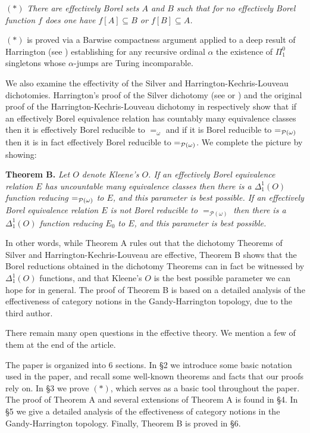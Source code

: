 \documentclass[11pt, english]{article}
\begin{document}
$(*)$ \emph{There are effectively Borel sets $A$ and $B$ such that
for no effectively Borel function $f$ does one have $f[A]\subseteq
B$ or $f[B]\subseteq A$.}

\medskip

$(*)$ is proved via a Barwise compactness argument applied to a deep
result of Harrington (see \cite{hjohar}) establishing for any
recursive ordinal $\alpha$ the existence of $\Pi^0_1$ singletons
whose $\alpha$-jumps are Turing incomparable.

We also examine the effectivity of the Silver and
Harrington-Kechris-Louveau dichotomies. Harrington's proof of the
Silver dichotomy (see \cite{gao09} or \cite{jech03}) and the
original proof of the Harrington-Kechris-Louveau dichotomy in
\cite{hakelou90} respectively show that if an effectively Borel
equivalence relation has countably many equivalence classes then it
is effectively Borel reducible to $=_\omega$ and if it is Borel
reducible to $=_{{\cal P}(\omega)}$ then it is in fact effectively
Borel reducible to $=_{{\cal P}(\omega)}$. We complete the picture
by showing:

\medskip

\noindent \textbf{Theorem B.} \emph{Let $O$ denote Kleene's $O$. If
an effectively Borel equivalence relation $E$ has uncountable many
equivalence classes then there is a $\Delta^1_1(O)$ function
reducing $=_{{\cal P}(\omega)}$ to $E$, and this parameter is best
possible. If an effectively Borel equivalence relation $E$ is not
Borel reducible to $=_{{\mathcal P}(\omega)}$ then there is a
$\Delta^1_1(O)$ function reducing $E_0$ to $E$, and this parameter
is best possible.}

\medskip

In other words, while Theorem A rules out that the dichotomy
Theorems of Silver and Harrington-Kechris-Louveau are effective,
Theorem B shows that the Borel reductions obtained in the dichotomy
Theorems can in fact be witnessed by $\Delta^1_1(O)$ functions, and
that Kleene's $O$ is the best possible parameter we can hope for in
general. The proof of Theorem B is based on a detailed analysis of
the effectiveness of category notions in the Gandy-Harrington
topology, due to the third author.

There remain many open questions in the effective theory. We mention
a few of them at the end of the article.

\medskip

 The paper is organized into 6 sections.
In \S 2 we introduce some basic notation used in the paper, and
recall some well-known theorems and facts that our proofs rely on.
In \S 3 we prove $(*)$, which serves as a basic tool throughout the
paper. The proof of Theorem A and several extensions of Theorem A is
found in \S 4. In \S 5 we give a detailed analysis of the
effectiveness of category notions in the Gandy-Harrington topology.
Finally, Theorem B is proved in \S6.
\end{document}

